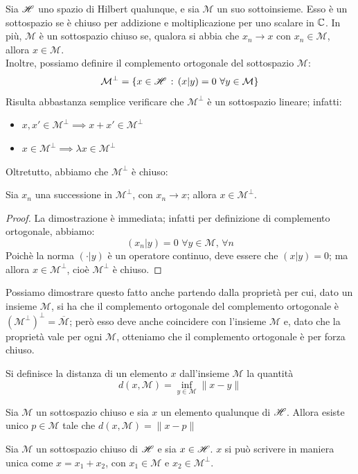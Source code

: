 Sia $\mathscr{H}$ uno spazio di Hilbert qualunque, e sia $\mathcal{M}$ un suo sottoinsieme. Esso è un sottospazio se è chiuso per addizione e moltiplicazione per uno scalare in $\mathbb{C}$. In più, $\mathcal{M}$ è un sottospazio chiuso se, qualora si abbia che $x_n \to x$ con $x_n \in \mathcal{M}$, allora $x \in \mathcal{M}$.\\
Inoltre, possiamo definire il complemento ortogonale del sottospazio $\mathcal{M}$:
$$\mathcal{M}^{\perp}=\left\{x \in \mathscr{H} \, : \, (x|y)=0 \, \, \forall y \in \mathcal{M} \right\}$$
Risulta abbastanza semplice verificare che $\mathcal{M}^{\perp}$ è un sottospazio lineare; infatti:
\begin{itemize}
\item $x, x' \in \mathcal{M}^{\perp} \implies x+x' \in \mathcal{M}^{\perp}$
\item $x \in \mathcal{M}^{\perp} \implies \lambda x \in \mathcal{M}^{\perp}$
\end{itemize}
Oltretutto, abbiamo che $\mathcal{M}^{\perp}$ è chiuso:
\begin{teorema}
Sia $x_n$ una successione in $\mathcal{M}^{\perp}$, con $x_n \to x$; allora $x \in \mathcal{M}^{\perp}$.
\end{teorema}
\begin{proof}
La dimostrazione è immediata; infatti per definizione di complemento ortogonale, abbiamo:
$$(x_n|y)=0 \, \, \forall y \in \mathcal{M}, \, \forall n$$
Poichè la norma $( \cdot |y)$ è un operatore continuo, deve essere che $(x|y)=0$; ma allora $x \in  \mathcal{M}^{\perp}$, cioè $\mathcal{M}^{\perp}$ è chiuso.
\end{proof}
Possiamo dimostrare questo fatto anche partendo dalla proprietà per cui, dato un insieme $\mathcal{M}$, si ha che il complemento ortogonale del complemento ortogonale è $(\mathcal{M}^{\perp})^{\perp}=\overline{\mathcal{M}}$; però esso deve anche coincidere con l'insieme $\mathcal{M}$ e, dato che la proprietà vale per ogni $\mathcal{M}$, otteniamo che il complemento ortogonale è per forza chiuso.
\begin{definizione}
Si definisce la distanza di un elemento $x$ dall'insieme $\mathcal{M}$ la quantità
$$d(x,\mathcal{M})= \inf_{y \in \mathcal{M}} \|x-y\|$$
\end{definizione}
\begin{teorema}
Sia $\mathcal{M}$ un sottospazio chiuso e sia $x$ un elemento qualunque di $\mathscr{H}$. Allora esiste unico $p \in \mathcal{M}$ tale che $d(x,\mathcal{M}) = \|x-p\|$
\end{teorema}
\begin{teorema}
Sia $\mathcal{M}$ un sottospazio chiuso di $\mathscr{H}$ e sia $x \in \mathscr{H}$. $x$ si può scrivere in maniera unica come $x=x_1 + x_2$, con $x_1 \in \mathcal{M}$ e $x_2 \in \mathcal{M}^{\perp}$.
\end{teorema}
